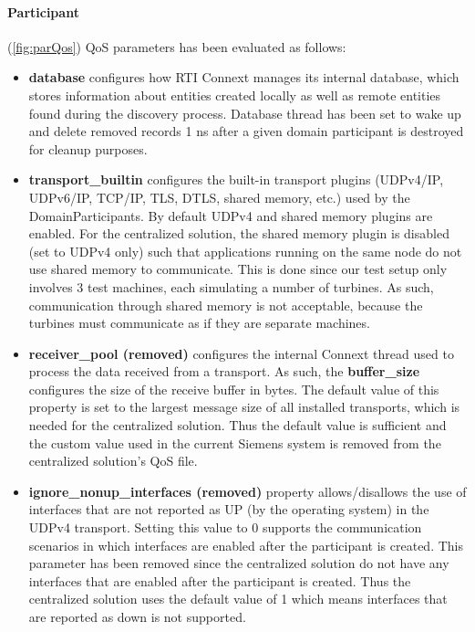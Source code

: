\paragraph{Participant} (\cref{fig:parQos}) QoS parameters has been evaluated as follows:
 
\begin{itemize}
	\item \textbf{database} configures how RTI Connext manages its internal database, which stores information about entities created locally as well as remote entities found during the discovery process. Database thread has been set to wake up and delete removed records 1 ns after a given domain participant is destroyed for cleanup purposes.
	
	\item \textbf{transport\_builtin} configures the built-in transport plugins (UDPv4/IP, UDPv6/IP, TCP/IP, TLS, DTLS, shared memory, etc.) used by the DomainParticipants. By default UDPv4 and shared memory plugins are enabled. For the centralized solution, the shared memory plugin is disabled (set to UDPv4 only) such that applications running on the same node do not use shared memory to communicate. This is done since our test setup only involves 3 test machines, each simulating a number of turbines. As such, communication through shared memory is not acceptable, because the turbines must communicate as if they are separate machines.
	
	\item \textbf{receiver\_pool (removed)} configures the internal Connext thread used to process the data received from a transport. As such, the \textbf{buffer\_size} configures the size of the receive buffer in bytes. The default value of this property is set to the largest message size of all installed transports, which is needed for the centralized solution. Thus the default value is sufficient and the custom value used in the current Siemens system is removed from the centralized solution's QoS file.
	
	\item \textbf{ignore\_nonup\_interfaces (removed)} property allows/disallows the use of interfaces that are not reported as UP (by the operating system) in the UDPv4 transport. Setting this value to 0 supports the communication scenarios in which interfaces are enabled after the participant is created. This parameter has been removed since the centralized solution do not have any interfaces that are enabled after the participant is created. Thus the centralized solution uses the default value of 1 which means interfaces that are reported as down is not supported.
	

\end{itemize}
